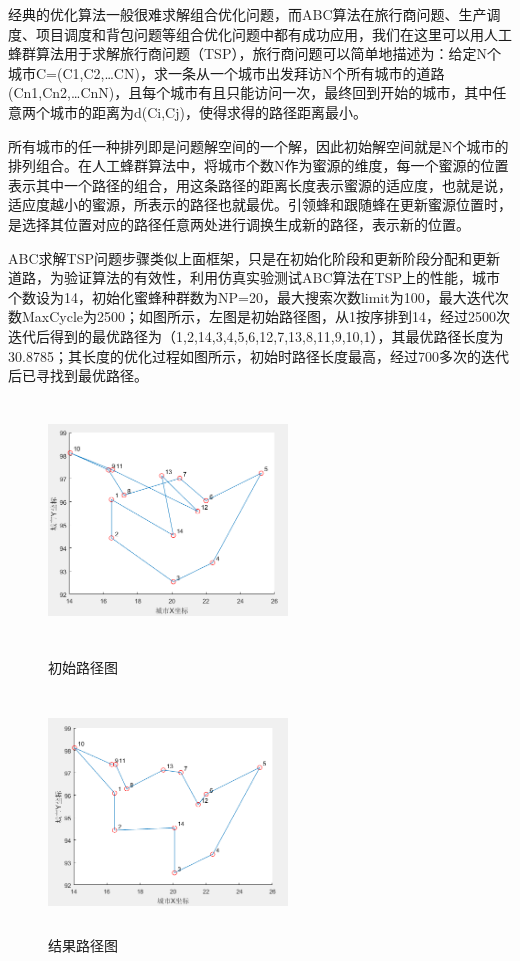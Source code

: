 \documentclass[a4paper,12pt]{report}
\begin{document}
\begin{spacing}{1.5}
	经典的优化算法一般很难求解组合优化问题，而ABC算法在旅行商问题、生产调度、项目调度和背包问题等组合优化问题中都有成功应用，我们在这里可以用人工蜂群算法用于求解旅行商问题（TSP），旅行商问题可以简单地描述为：给定N个城市C=(C1,C2,…CN)，求一条从一个城市出发拜访N个所有城市的道路(Cn1,Cn2,…CnN)，且每个城市有且只能访问一次，最终回到开始的城市，其中任意两个城市的距离为d(Ci,Cj)，使得求得的路径距离最小。

	所有城市的任一种排列即是问题解空间的一个解，因此初始解空间就是N个城市的排列组合。在人工蜂群算法中，将城市个数N作为蜜源的维度，每一个蜜源的位置表示其中一个路径的组合，用这条路径的距离长度表示蜜源的适应度，也就是说，适应度越小的蜜源，所表示的路径也就最优。引领蜂和跟随蜂在更新蜜源位置时，是选择其位置对应的路径任意两处进行调换生成新的路径，表示新的位置。

	ABC求解TSP问题步骤类似上面框架，只是在初始化阶段和更新阶段分配和更新道路，为验证算法的有效性，利用仿真实验测试ABC算法在TSP上的性能，城市个数设为14，初始化蜜蜂种群数为NP=20，最大搜索次数limit为100，最大迭代次数MaxCycle为2500；如图所示，左图是初始路径图，从1按序排到14，经过2500次迭代后得到的最优路径为（1,2,14,3,4,5,6,12,7,13,8,11,9,10,1），其最优路径长度为30.8785；其长度的优化过程如图所示，初始时路径长度最高，经过700多次的迭代后已寻找到最优路径。


		\begin{figure}[htb]
		\begin{minipage}[b]{0.5\linewidth}
		\centering
		\includegraphics[width=2.5in,height=2.5in]{pic/bee7.png}
		\caption{初始路径图}
		\label{F4-5}
		\end{minipage}
		\begin{minipage}[b]{0.5\linewidth}
		\centering
		\includegraphics[width=2.5in,height=2.5in]{pic/bee8.png}
		\caption{结果路径图}
		\label{F4-6}
		\end{minipage}%
		\end{figure}


\end{spacing}
\end{document}
